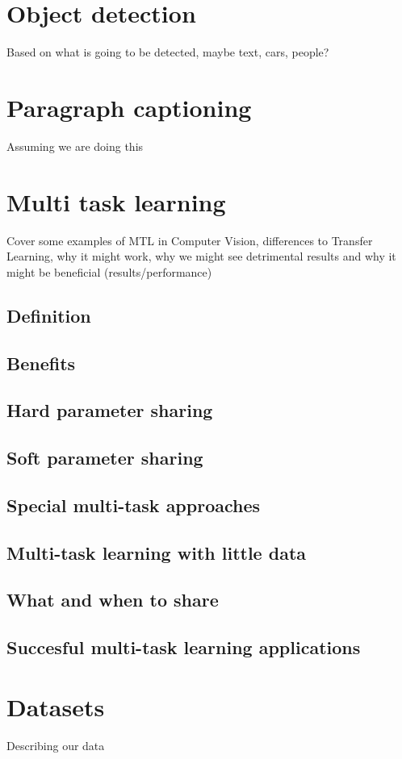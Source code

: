 \chapter{Object detection}
Based on what is going to be detected, maybe text, cars, people?
\chapter{Paragraph captioning}
Assuming we are doing this
\chapter{Multi task learning}
Cover some examples of MTL in Computer Vision, differences to Transfer Learning, why it might work, why we might see detrimental results and why it might be beneficial (results/performance)
\section{Definition}
\section{Benefits}
\section{Hard parameter sharing}
\section{Soft parameter sharing}
\section{Special multi-task approaches}
\section{Multi-task learning with little data}
\section{What and when to share}
\section{Succesful multi-task learning applications}
\chapter{Datasets}
Describing our data
